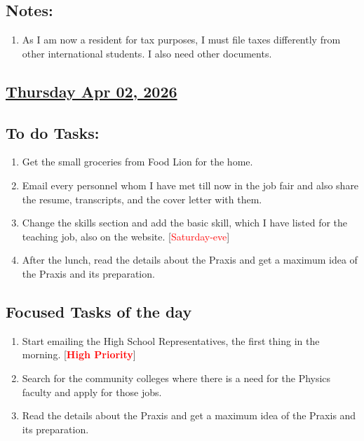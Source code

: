 \subsection*{Notes:}
\begin{enumerate}
    \item As I am now a resident for tax purposes, I must file taxes differently from other international students. I also need other documents.
\end{enumerate}
\subsection*{\underline{Thursday Apr 02, 2026}}
\subsection*{To do Tasks:}
\begin{enumerate}
    \item Get the small groceries from Food Lion for the home. \cmark
    \item Email every personnel whom I have met till now in the job fair and also share the resume, transcripts, and the cover letter with them. \cmark
    \item Change the skills section and add the basic skill, which I have listed for the teaching job, also on the website. [\textcolor{red}{Saturday-eve}]
    \item After the lunch, read the details about the Praxis and get a maximum idea of the Praxis and its preparation. \xmark
\end{enumerate}
\subsection*{Focused Tasks of the day}
\begin{enumerate}[\ding{212}]  
    \item Start emailing the High School Representatives, the first thing in the morning. [\textcolor{red}{\textbf{High Priority}}]
    \item Search for the community colleges where there is a need for the Physics faculty and apply for those jobs. \xmark
    \item Read the details about the Praxis and get a maximum idea of the Praxis and its preparation. \xmark
\end{enumerate}
